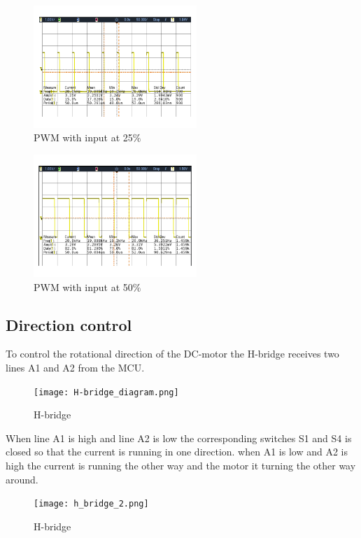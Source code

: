   \begin{figure}[!h]
	\centering
	\includegraphics[width=0.55\textwidth]{resources/Scop/PWM_motot_right_PWMin25.png}
	\caption{PWM with input at 25$\%$}
	\label{fig:1}
\end{figure}

  \begin{figure}[!h]
	\centering
	\includegraphics[width=0.55\textwidth]{resources/Scop/PWM_motot_right_PWMin50.png}
	\caption{PWM with input at 50$\%$}
	\label{fig:2}
\end{figure}

\newpage
\subsection{Direction control} 
To control the rotational direction of the DC-motor the H-bridge receives two lines A1 and A2 from the MCU.

  \begin{figure}[!h!]
	\centering
	\texttt{[image: H-bridge\_diagram.png]}
	\caption{H-bridge}
	\label{fig:3}
\end{figure}
When line A1 is high and line A2 is low the corresponding switches S1 and S4 is closed so that the current is running in one direction. when A1 is low and A2 is high the current is running the other way and the motor it turning the other way around. \\

  \begin{figure}[!h!]
	\centering
	\texttt{[image: h\_bridge\_2.png]}
	\caption{H-bridge}
	\label{fig:3}
\end{figure}


